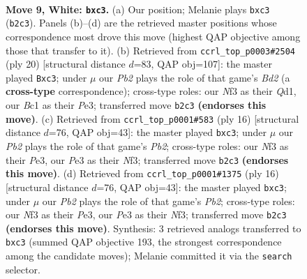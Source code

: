 \documentclass[11pt]{article}
\begin{document}
\clearpage

\begin{figure}[p]\centering
\begin{subfigure}{0.46\textwidth}\centering
\resizebox{\linewidth}{!}{%
\newchessgame
\chessboard[
  setfen={rnbq1rk1/pp3ppp/4p3/2pP3n/3P4/2bBPN2/PP3PPP/R1BQ1RK1 w - - 0 9},
  showmover=false,
  pgfstyle=straightmove, color=movearrow, markmove={b2-c3}
]}
\caption{}
\end{subfigure}\hfill
\begin{subfigure}{0.46\textwidth}\centering
\resizebox{\linewidth}{!}{%
\newchessgame
\chessboard[
  setfen={rn1q1rk1/pb3ppp/1p2pn2/2p5/2BP4/P1b1PN2/1P1B1PPP/R2Q1RK1 w - - 0 11},
  showmover=false,
  pgfstyle=straightmove, color=movearrow, markmove={d2-c3}
]}
\caption{}
\end{subfigure}
\\[4pt]
\begin{subfigure}{0.46\textwidth}\centering
\resizebox{\linewidth}{!}{%
\newchessgame
\chessboard[
  setfen={rnbq1rk1/pp3ppp/4pn2/2p5/2BP4/P1b1PN2/1P3PPP/R1BQK2R w KQ - 0 9},
  showmover=false,
  pgfstyle=straightmove, color=movearrow, markmove={b2-c3}
]}
\caption{}
\end{subfigure}\hfill
\begin{subfigure}{0.46\textwidth}\centering
\resizebox{\linewidth}{!}{%
\newchessgame
\chessboard[
  setfen={rnbq1rk1/pp3ppp/4pn2/2p5/2BP4/P1b1PN2/1P3PPP/R1BQK2R w KQ - 0 9},
  showmover=false,
  pgfstyle=straightmove, color=movearrow, markmove={b2-c3}
]}
\caption{}
\end{subfigure}
\caption{\textbf{Move 9, White: \texttt{bxc3}.} (a) Our position; Melanie plays \texttt{bxc3} (\texttt{b2c3}). Panels (b)--(d) are the retrieved master positions whose correspondence most drove this move (highest QAP objective among those that transfer to it). (b) Retrieved from \texttt{ccrl\_top\_p0003\#2504} (ply 20) [structural distance $d$=83, QAP obj=107]: the master played \texttt{Bxc3}; under $\mu$ our \emph{Pb2} plays the role of that game's \emph{Bd2} (a \textbf{cross-type} correspondence); cross-type roles: our \emph{N}f3 as their \emph{Q}d1, our \emph{B}c1 as their \emph{P}e3; transferred move \texttt{b2c3} \textbf{(endorses this move)}. (c) Retrieved from \texttt{ccrl\_top\_p0001\#583} (ply 16) [structural distance $d$=76, QAP obj=43]: the master played \texttt{bxc3}; under $\mu$ our \emph{Pb2} plays the role of that game's \emph{Pb2}; cross-type roles: our \emph{N}f3 as their \emph{P}e3, our \emph{P}e3 as their \emph{N}f3; transferred move \texttt{b2c3} \textbf{(endorses this move)}. (d) Retrieved from \texttt{ccrl\_top\_p0001\#1375} (ply 16) [structural distance $d$=76, QAP obj=43]: the master played \texttt{bxc3}; under $\mu$ our \emph{Pb2} plays the role of that game's \emph{Pb2}; cross-type roles: our \emph{N}f3 as their \emph{P}e3, our \emph{P}e3 as their \emph{N}f3; transferred move \texttt{b2c3} \textbf{(endorses this move)}. Synthesis: 3 retrieved analogs transferred to \texttt{bxc3} (summed QAP objective 193, the strongest correspondence among the candidate moves); Melanie committed it via the \texttt{search} selector.}
\label{fig:thought-m16}
\end{figure}
\end{document}
